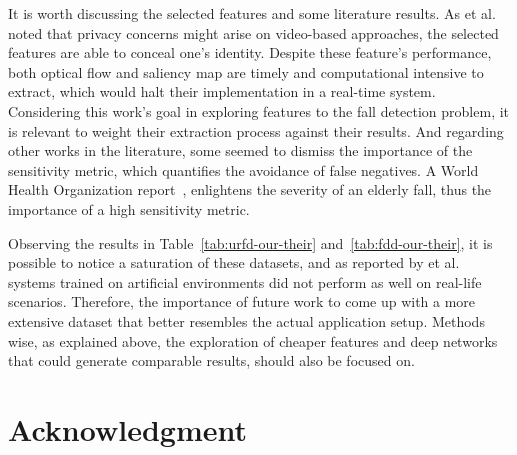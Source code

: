 \documentclass[conference]{IEEEtran}
\begin{document}
It is worth discussing the selected features and some literature results. As et al.~\cite{chernbumroong2012elderly} noted that privacy concerns might arise on video-based approaches, the selected features are able to conceal one's identity. Despite these feature's performance, both optical flow and saliency map are timely and computational intensive to extract, which would halt their implementation in a real-time system. Considering this work's goal in exploring features to the fall detection problem, it is relevant to weight their extraction process against their results. And regarding other works in the literature, some seemed to dismiss the importance of the sensitivity metric, which quantifies the avoidance of false negatives. A World Health Organization report~\cite{who2007report}, enlightens the severity of an elderly fall, thus the importance of a high sensitivity metric.


Observing the results in Table~\ref{tab:urfd-our-their} and~\ref{tab:fdd-our-their}, it is possible to notice a saturation of these datasets, and as reported by et al.~\cite{chernbumroong2012elderly} systems trained on artificial environments did not perform as well on real-life scenarios. Therefore, the importance of future work to come up with a more extensive dataset that better resembles the actual application setup. Methods wise, as explained above, the exploration of cheaper features and deep networks that could generate comparable results, should also be focused on.

\section*{Acknowledgment}




\end{document}
